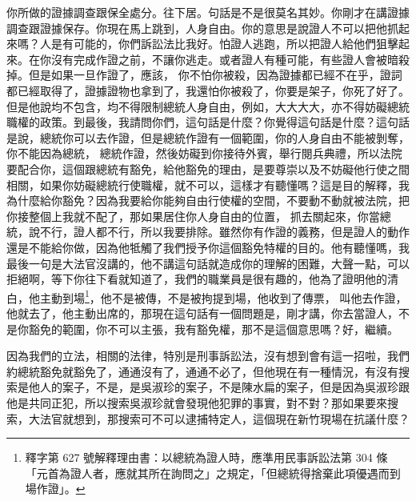 \hypertarget{c11:cue:169}{}你所做的證據調查跟保全處分。往下居。句話是不是很莫名其妙。你剛才在講證據調查跟證據保存。你現在馬上跳到，人身自由。你的意思是說證人不可以把他抓起來嗎？人是有可能的，你們訴訟法比我好。怕證人逃跑，所以把證人給他們狙擊起來。在你沒有完成作證之前，不讓你逃走。或者證人有種可能，有些證人會被暗殺掉。但是如果一旦作證了，應該，
\hypertarget{c11:cue:170}{}你不怕你被殺，因為證據都已經不在乎，證詞都已經取得了，證據證物也拿到了，我還怕你被殺了，你要是架子，你死了好了。但是他說均不包含，均不得限制總統人身自由，例如，大大大大，亦不得妨礙總統職權的政策。到最後，我請問你們，這句話是什麼？你覺得這句話是什麼？這句話是說，總統你可以去作證，但是總統作證有一個範圍，你的人身自由不能被剝奪，你不能因為總統，
\hypertarget{c11:cue:171}{}總統作證，然後妨礙到你接待外賓，舉行閱兵典禮，所以法院要配合你，這個跟總統有豁免，給他豁免的理由，是要尊崇以及不妨礙他行使之間相關，如果你妨礙總統行使職權，就不可以，這樣才有聽懂嗎？這是目的解釋，我為什麼給你豁免？因為我要給你能夠自由行使權的空間，不要動不動就被法院，把你接整個上我就不配了，那如果居住你人身自由的位置，
\hypertarget{c11:cue:172}{}抓去關起來，你當總統，說不行，證人都不行，所以我要排除。雖然你有作證的義務，但是證人的動作還是不能給你做，因為他牴觸了我們授予你這個豁免特權的目的。他有聽懂嗎，我最後一句是大法官沒講的，他不講這句話就造成你的理解的困難，大聲一點，可以拒絕啊，等下你往下看就知道了，我們的職業員是很有趣的，他為了證明他的清白，他主動到場\footnote{釋字第 627 號解釋理由書：以總統為證人時，應準用民事訴訟法第 304 條「元首為證人者，應就其所在詢問之」之規定，「但總統得捨棄此項優遇而到場作證」。}，他不是被傳，不是被拘提到場，他收到了傳票，
\hypertarget{c11:cue:173}{}叫他去作證，他就去了，他主動出席的，那現在這句話有一個問題是，剛才講，你去當證人，不是你豁免的範圍，你不可以主張，我有豁免權，那不是這個意思嗎？好，繼續。

\hypertarget{c11:cue:174}{}因為我們的立法，相關的法律，特別是刑事訴訟法，沒有想到會有這一招啦，我們約總統豁免就豁免了，通通沒有了，通通不必了，但他現在有一種情況，有沒有搜索是他人的案子，不是，是吳淑珍的案子，不是陳水扁的案子，但是因為吳淑珍跟他是共同正犯，所以搜索吳淑珍就會發現他犯罪的事實，對不對？那如果要來搜索，大法官就想到，那搜索可不可以逮捕特定人，這個現在新竹現場在抗議什麼？

